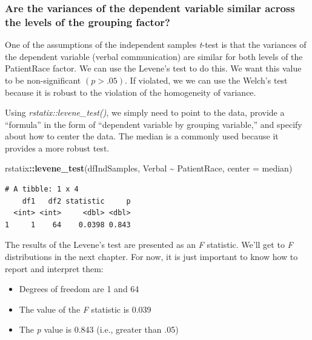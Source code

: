 \documentclass[
  11pt,
]{book}
\newenvironment{Shaded}{\begin{snugshade}}{\end{snugshade}}
\newcommand{\AttributeTok}[1]{\textcolor[rgb]{0.27,0.27,0.27}{#1}}
\newcommand{\FunctionTok}[1]{\textcolor[rgb]{0.27,0.27,0.27}{\textbf{#1}}}
\newcommand{\NormalTok}[1]{#1}
\newcommand{\SpecialCharTok}[1]{\textcolor[rgb]{0.43,0.43,0.43}{\textbf{#1}}}
\providecommand{\tightlist}{%
  \setlength{\itemsep}{0pt}\setlength{\parskip}{0pt}}
\begin{document}
\hypertarget{are-the-variances-of-the-dependent-variable-similar-across-the-levels-of-the-grouping-factor}{%
\subsubsection{Are the variances of the dependent variable similar across the levels of the grouping factor?}\label{are-the-variances-of-the-dependent-variable-similar-across-the-levels-of-the-grouping-factor}}

One of the assumptions of the independent samples \emph{t}-test is that the variances of the dependent variable (verbal communication) are similar for both levels of the PatientRace factor. We can use the Levene's test to do this. We want this value to be non-significant \((p > .05)\). If violated, we we can use the Welch's test because it is robust to the violation of the homogeneity of variance.

Using \emph{rstatix::levene\_test()}, we simply need to point to the data, provide a ``formula'' in the form of ``dependent variable by grouping variable,'' and specify about how to center the data. The median is a commonly used because it provides a more robust test.

\begin{Shaded}
\begin{Highlighting}[]
\NormalTok{rstatix}\SpecialCharTok{::}\FunctionTok{levene\_test}\NormalTok{(dfIndSamples, Verbal }\SpecialCharTok{\textasciitilde{}}\NormalTok{ PatientRace, }\AttributeTok{center =}\NormalTok{ median)}
\end{Highlighting}
\end{Shaded}

\begin{verbatim}
# A tibble: 1 x 4
    df1   df2 statistic     p
  <int> <int>     <dbl> <dbl>
1     1    64    0.0398 0.843
\end{verbatim}

The results of the Levene's test are presented as an \emph{F} statistic. We'll get to \emph{F} distributions in the next chapter. For now, it is just important to know how to report and interpret them:

\begin{itemize}
\tightlist
\item
  Degrees of freedom are 1 and 64
\item
  The value of the \emph{F} statistic is 0.039
\item
  The \emph{p} value is 0.843 (i.e., greater than .05)
\end{itemize}
\end{document}
